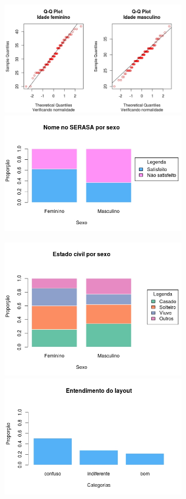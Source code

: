 \documentclass[]{article}
\begin{document}
\includegraphics[width=3.12500in]{QQ Plot idade genero.jpeg}
\includegraphics[width=3.12500in]{Nome no SERASA por sexo.jpeg}

\includegraphics[width=3.12500in]{Estado civil por Sexo.jpeg}
\includegraphics[width=3.12500in]{Entedimento do Layout.jpeg}
\end{document}
